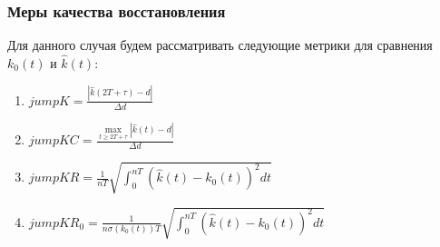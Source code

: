 \documentclass{beamer}
\begin{document}
\begin{frame}
\frametitle{Меры качества восстановления}
Для данного случая будем рассматривать следующие метрики для сравнения $k_0(t)$ и $\hat{k}(t)$:
\begin{enumerate}
	\item $jumpK=\frac{\left| \hat{k}(2T+\tau)-d \right|}{\Delta d}$
	\item $jumpKC=\frac{\max\limits_{t\ge 2T+\tau} \left| \hat{k}(t)-d \right|}{\Delta d}$
	\item $jumpKR=\frac{1}{nT}\sqrt{\int_0^{nT} \left(\hat{k}(t)-k_0(t)\right)^2 dt}$
	\item $jumpKR_0=\frac{1}{n\sigma(k_0(t))T}\sqrt{\int_0^{nT} \left(\hat{k}(t)-k_0(t)\right)^2 dt}$
\end{enumerate}
\end{frame}
\end{document}
